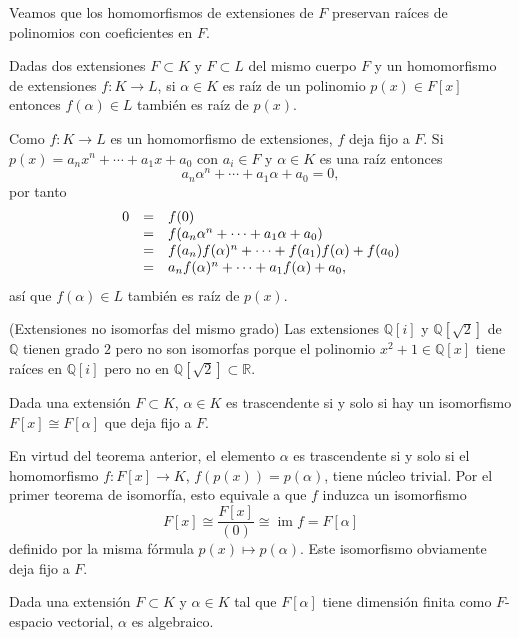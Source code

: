 
Veamos que los homomorfismos de extensiones de \(F\) preservan raíces de
polinomios con coeficientes en \(F\).


Dadas dos extensiones \(F\subset K\) y \(F\subset L\) del mismo cuerpo
\(F\) y un homomorfismo de extensiones \(f\colon K\rightarrow L\), si
\(\alpha\in K\) es raíz de un polinomio \(p(x)\in F[x]\) entonces
\(f(\alpha)\in L\) también es raíz de \(p(x)\). 


Como \(f\colon K\rightarrow L\) es un homomorfismo de extensiones, \(f\)
deja fijo a \(F\). Si \(p(x)=a_nx^n+\cdots+a_1x+a_0\) con
\(a_i\in F\) y \(\alpha\in K\) es una raíz entonces
\[a_n\alpha^n+\cdots+a_1\alpha+a_0=0,\] por tanto
\[\begin{array}{rcl} 0&=&f(0)\cr &=&f(a_n\alpha^n+\cdots+a_1\alpha+a_0)\cr &=&f(a_n)f(\alpha)^n+\cdots+f(a_1)f(\alpha)+f(a_0)\cr &=&a_nf(\alpha)^n+\cdots+a_1f(\alpha)+a_0, \end{array}\]
así que \(f(\alpha)\in L\) también es raíz de \(p(x)\). 

\textrm{\normalfont (Extensiones no isomorfas del mismo grado)}
Las extensiones \(\mathbb Q[i]\) y \(\mathbb Q[\sqrt{2}]\) de
\(\mathbb Q\) tienen grado \(2\) pero no son isomorfas porque el
polinomio \(x^2+1\in\mathbb Q[x]\) tiene raíces en \(\mathbb Q[i]\) pero
no en \(\mathbb Q[\sqrt{2}]\subset\mathbb R\). 


Dada una extensión \(F\subset K\), \(\alpha\in K\) es trascendente si y
solo si hay un isomorfismo \(F[x]\cong F[\alpha]\) que deja fijo a
\(F\). 


En virtud del teorema anterior, el elemento \(\alpha\) es trascendente
si y solo si el homomorfismo \(f\colon F[x]\rightarrow K\),
\(f(p(x))=p(\alpha)\), tiene núcleo trivial. Por el primer teorema de
isomorfía, esto equivale a que \(f\) induzca un isomorfismo
\[F[x]\cong \frac{F[x]}{(0)}\cong\operatorname{im} f=F[\alpha]\]
definido por la misma fórmula \(p(x)\mapsto p(\alpha)\). Este
isomorfismo obviamente deja fijo a \(F\). 


Dada una extensión \(F\subset K\) y \(\alpha\in K\) tal que
\(F[\alpha]\) tiene dimensión finita como \(F\)-espacio vectorial,
\(\alpha\) es algebraico. 


